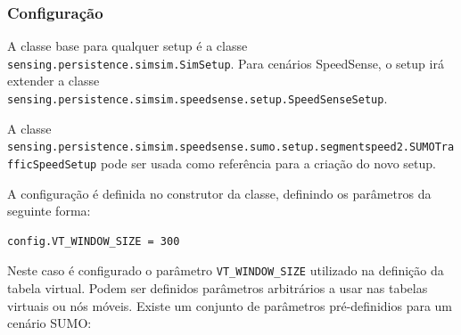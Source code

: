 \documentclass{article}
\newcommand{\tm}[1]{\texttt{#1}}
\begin{document}
\subsubsection{Configuração}
A classe base para qualquer setup é a classe \tm{sensing.persistence.simsim.SimSetup}. Para cenários SpeedSense, o setup irá extender a classe \tm{sensing.persistence.simsim.speedsense.setup.SpeedSenseSetup}.

A classe \tm{sensing.persistence.simsim.speedsense.sumo.setup.segmentspeed2.SUMOTrafficSpeedSetup} pode ser usada como referência para a criação do novo setup.

A configuração é definida no construtor da classe, definindo os parâmetros da seguinte forma:

\begin{Verbatim}
config.VT_WINDOW_SIZE = 300
\end{Verbatim}

Neste caso é configurado o parâmetro \tm{VT\_WINDOW\_SIZE} utilizado na definição da tabela virtual. Podem ser definidos parâmetros arbitrários a usar nas tabelas virtuais ou nós móveis. Existe um conjunto de parâmetros pré-definidios para um cenário SUMO:
\end{document}
